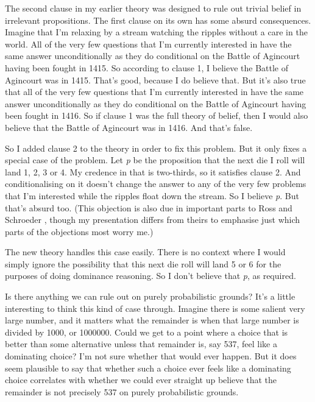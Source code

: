 \documentclass[
  11pt,
]{book}
\begin{document}
The second clause in my earlier theory was designed to rule out trivial belief in irrelevant propositions. The first clause on its own has some absurd consequences. Imagine that I'm relaxing by a stream watching the ripples without a care in the world. All of the very few questions that I'm currently interested in have the same answer unconditionally as they do conditional on the Battle of Agincourt having been fought in 1415. So according to clause 1, I believe the Battle of Agincourt was in 1415. That's good, because I do believe that. But it's also true that all of the very few questions that I'm currently interested in have the same answer unconditionally as they do conditional on the Battle of Agincourt having been fought in 1416. So if clause 1 was the full theory of belief, then I would also believe that the Battle of Agincourt was in 1416. And that's false.

So I added clause 2 to the theory in order to fix this problem. But it only fixes a special case of the problem. Let \emph{p} be the proposition that the next die I roll will land 1, 2, 3 or 4. My credence in that is two-thirds, so it satisfies clause 2. And conditionalising on it doesn't change the answer to any of the very few problems that I'm interested while the ripples float down the stream. So I believe \emph{p}. But that's absurd too. (This objection is also due in important parts to Ross and Schroeder \citeyearpar{RossSchroeder2014}, though my presentation differs from theirs to emphasise just which parts of the objections most worry me.)

The new theory handles this case easily. There is no context where I would simply ignore the possibility that this next die roll will land 5 or 6 for the purposes of doing dominance reasoning. So I don't believe that \emph{p}, as required.

Is there anything we can rule out on purely probabilistic grounds? It's a little interesting to think this kind of case through. Imagine there is some salient very large number, and it matters what the remainder is when that large number is divided by 1000, or 1000000. Could we get to a point where a choice that is better than some alternative unless that remainder is, say 537, feel like a dominating choice? I'm not sure whether that would ever happen. But it does seem plausible to say that whether such a choice ever feels like a dominating choice correlates with whether we could ever straight up believe that the remainder is not precisely 537 on purely probabilistic grounds.
\end{document}

